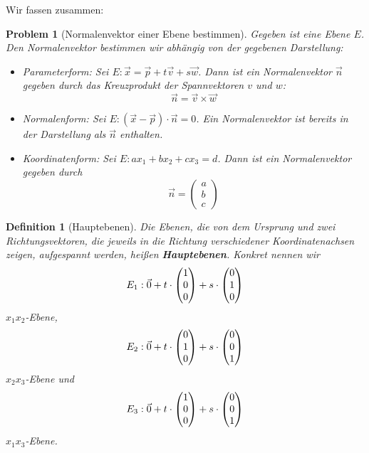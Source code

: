 \documentclass[11pt,reqno, a4paper]{book}
\newcommand{\normal}[1]{{\normalfont #1}}
\newcommand*\colvec[3][]{
\begin{pmatrix}\ifx\relax#1\relax\else#1\\\fi#2\\#3\end{pmatrix}
}
\renewcommand{\textbf}[1]{{\normalfont\bf #1}}
\theoremstyle{mystyle}
\newtheorem{definition}[theorem]{Definition}
\newtheorem{problem}[theorem]{Problem}
\theoremstyle{definition}
\numberwithin{equation}{chapter}
\begin{document}
Wir fassen zusammen: 
\begin{problem}[Normalenvektor einer Ebene bestimmen]
    Gegeben ist eine Ebene \(E\). Den Normalenvektor bestimmen wir abhängig von der gegebenen Darstellung: 
    \begin{itemize}
        \item \normal{Parameterform}: Sei \(E: \vec x = \vec p + t\vec v + s\vec w\). Dann ist ein Normalenvektor \(\vec n\) gegeben durch das Kreuzprodukt der Spannvektoren \(v\) und \(w\): \begin{equation*}
            \vec n = \vec v \times \vec w
        \end{equation*}

        \item \normal{Normalenform}: Sei \(E: (\vec x - \vec p)\cdot \vec n = 0\). Ein Normalenvektor ist bereits in der Darstellung als \(\vec n\) enthalten. 

        \item \normal{Koordinatenform}: Sei \(E: ax_1 + bx_2 + cx_3 = d\). Dann ist ein Normalenvektor gegeben durch \begin{equation*}
            \vec n = \begin{pmatrix}
                a \\ b \\ c
            \end{pmatrix}
        \end{equation*}
    \end{itemize}
\end{problem}

\begin{definition}[Hauptebenen]
    Die Ebenen, die von dem Ursprung und zwei Richtungsvektoren, die jeweils in die Richtung verschiedener Koordinatenachsen zeigen, aufgespannt werden, heißen \textbf{Hauptebenen}. Konkret nennen wir 
    \begin{equation*}
        E_1 : \vec 0 + t\cdot \colvec[1]{0}{0} + s \cdot \colvec[0]{1}{0}
    \end{equation*}
    \(x_1x_2\)-Ebene, 
    \begin{equation*}
        E_2 : \vec 0 + t \cdot \colvec[0]{1}{0} + s \cdot \colvec[0]{0}{1}
    \end{equation*}
    \(x_2x_3\)-Ebene und 
    \begin{equation*}
        E_3 : \vec 0 + t\cdot \colvec[1]{0}{0} + s \cdot \colvec[0]{0}{1}
    \end{equation*}
    \(x_1x_3\)-Ebene. 
\end{definition}
\end{document}

